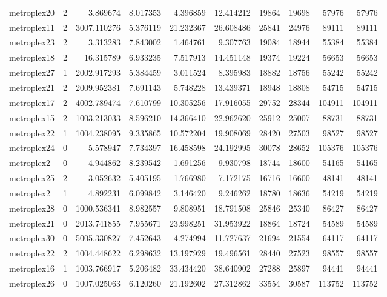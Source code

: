 \begin{longtable}{|l|r|r|r|r|r|r|r|r|r|}
metroplex20 & 2 & 3.869674 & 8.017353 & 4.396859 & 12.414212 & 19864 & 19698 & 57976 & 57976 \\
metroplex11 & 2 & 3007.110276 & 5.376119 & 21.232367 & 26.608486 & 25841 & 24976 & 89111 & 89111 \\
metroplex23 & 2 & 3.313283 & 7.843002 & 1.464761 & 9.307763 & 19084 & 18944 & 55384 & 55384 \\
metroplex18 & 2 & 16.315789 & 6.933235 & 7.517913 & 14.451148 & 19374 & 19224 & 56653 & 56653 \\
metroplex27 & 1 & 2002.917293 & 5.384459 & 3.011524 & 8.395983 & 18882 & 18756 & 55242 & 55242 \\
metroplex21 & 2 & 2009.952381 & 7.691143 & 5.748228 & 13.439371 & 18948 & 18808 & 54715 & 54715 \\
metroplex17 & 2 & 4002.789474 & 7.610799 & 10.305256 & 17.916055 & 29752 & 28344 & 104911 & 104911 \\
metroplex15 & 2 & 1003.213033 & 8.596210 & 14.366410 & 22.962620 & 25912 & 25007 & 88731 & 88731 \\
metroplex22 & 1 & 1004.238095 & 9.335865 & 10.572204 & 19.908069 & 28420 & 27503 & 98527 & 98527 \\
metroplex24 & 0 & 5.578947 & 7.734397 & 16.458598 & 24.192995 & 30078 & 28652 & 105376 & 105376 \\
metroplex2 & 0 & 4.944862 & 8.239542 & 1.691256 & 9.930798 & 18744 & 18600 & 54165 & 54165 \\
metroplex25 & 2 & 3.052632 & 5.405195 & 1.766980 & 7.172175 & 16716 & 16600 & 48141 & 48141 \\
metroplex2 & 1 & 4.892231 & 6.099842 & 3.146420 & 9.246262 & 18780 & 18636 & 54219 & 54219 \\
metroplex28 & 0 & 1000.536341 & 8.982557 & 9.808951 & 18.791508 & 25846 & 25340 & 86427 & 86427 \\
metroplex21 & 0 & 2013.741855 & 7.955671 & 23.998251 & 31.953922 & 18864 & 18724 & 54589 & 54589 \\
metroplex30 & 0 & 5005.330827 & 7.452643 & 4.274994 & 11.727637 & 21694 & 21554 & 64117 & 64117 \\
metroplex22 & 2 & 1004.448622 & 6.298632 & 13.197929 & 19.496561 & 28440 & 27523 & 98557 & 98557 \\
metroplex16 & 1 & 1003.766917 & 5.206482 & 33.434420 & 38.640902 & 27288 & 25897 & 94441 & 94441 \\
metroplex26 & 0 & 1007.025063 & 6.120260 & 21.192602 & 27.312862 & 33554 & 30587 & 113752 & 113752 \\

\end{longtable}
